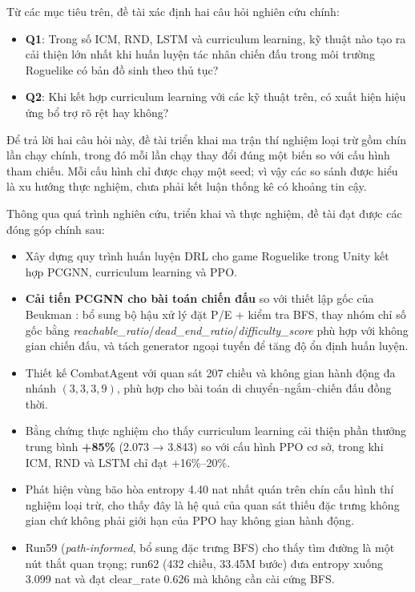 \vspace{0.5cm}

Từ các mục tiêu trên, đề tài xác định hai câu hỏi nghiên cứu chính:

\renewcommand{\labelitemi}{$-$}
\begin{itemize}
    \item \textbf{Q1}: Trong số ICM, RND, LSTM và curriculum learning, kỹ thuật nào tạo ra cải thiện lớn nhất khi huấn luyện tác nhân chiến đấu trong môi trường Roguelike có bản đồ sinh theo thủ tục?
    \item \textbf{Q2}: Khi kết hợp curriculum learning với các kỹ thuật trên, có xuất hiện hiệu ứng bổ trợ rõ rệt hay không?
\end{itemize}

Để trả lời hai câu hỏi này, đề tài triển khai ma trận thí nghiệm loại trừ gồm chín lần chạy chính, trong đó mỗi lần chạy thay đổi đúng một biến so với cấu hình tham chiếu. Mỗi cấu hình chỉ được chạy một seed; vì vậy các so sánh được hiểu là xu hướng thực nghiệm, chưa phải kết luận thống kê có khoảng tin cậy.

\vspace{0.3cm}


Thông qua quá trình nghiên cứu, triển khai và thực nghiệm, đề tài đạt được các đóng góp chính sau:

\renewcommand{\labelitemi}{$-$}
\begin{itemize}
    \item Xây dựng quy trình huấn luyện DRL cho game Roguelike trong Unity kết hợp PCGNN, curriculum learning và PPO.
    \item \textbf{Cải tiến PCGNN cho bài toán chiến đấu} so với thiết lập gốc của Beukman \cite{Beukman2022}: bổ sung bộ hậu xử lý đặt P/E + kiểm tra BFS, thay nhóm chỉ số gốc bằng \emph{reachable\_ratio}/\emph{dead\_end\_ratio}/\emph{difficulty\_score} phù hợp với không gian chiến đấu, và tách generator ngoại tuyến để tăng độ ổn định huấn luyện.
    \item Thiết kế CombatAgent với quan sát 207 chiều và không gian hành động đa nhánh $(3,3,3,9)$, phù hợp cho bài toán di chuyển--ngắm--chiến đấu đồng thời.
    \item Bằng chứng thực nghiệm cho thấy curriculum learning cải thiện phần thưởng trung bình \textbf{+85\%} (2.073 → 3.843) so với cấu hình PPO cơ sở, trong khi ICM, RND và LSTM chỉ đạt +16\%--20\%.
    \item Phát hiện vùng bão hòa entropy 4.40 nat nhất quán trên chín cấu hình thí nghiệm loại trừ, cho thấy đây là hệ quả của quan sát thiếu đặc trưng không gian chứ không phải giới hạn của PPO hay không gian hành động.
    \item Run59 (\emph{path-informed}, bổ sung đặc trưng BFS) cho thấy tìm đường là một nút thắt quan trọng; run62 (432 chiều, 33.45M bước) đưa entropy xuống 3.099 nat và đạt clear\_rate 0.626 mà không cần cài cứng BFS.
\end{itemize}

